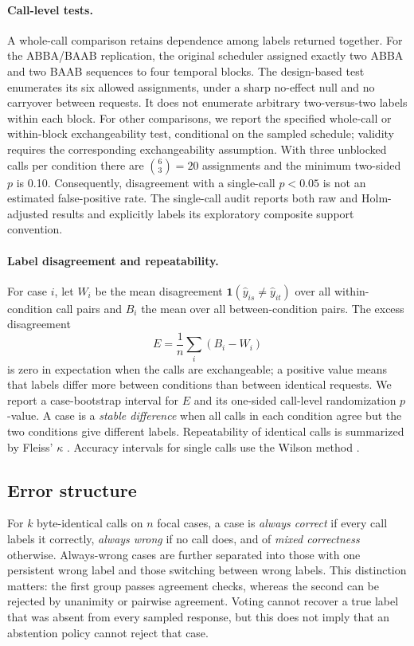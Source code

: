 \documentclass[11pt,a4paper]{article}
\begin{document}
\paragraph{Call-level tests.} A whole-call comparison retains dependence among labels returned together. For the ABBA/BAAB replication, the original scheduler assigned exactly two ABBA and two BAAB sequences to four temporal blocks. The design-based test enumerates its six allowed assignments, under a sharp no-effect null and no carryover between requests. It does not enumerate arbitrary two-versus-two labels within each block. For other comparisons, we report the specified whole-call or within-block exchangeability test, conditional on the sampled schedule; validity requires the corresponding exchangeability assumption. With three unblocked calls per condition there are $\binom{6}{3}=20$ assignments and the minimum two-sided $p$ is 0.10. Consequently, disagreement with a single-call $p<0.05$ is not an estimated false-positive rate. The single-call audit reports both raw and Holm-adjusted results and explicitly labels its exploratory composite support convention.

\paragraph{Label disagreement and repeatability.} For case $i$, let $W_i$ be the mean disagreement $\mathbf 1(\hat y_{is}\neq\hat y_{it})$ over all within-condition call pairs and $B_i$ the mean over all between-condition pairs. The excess disagreement
\begin{equation}
E=\frac1n\sum_i (B_i-W_i)
\end{equation}
is zero in expectation when the calls are exchangeable; a positive value means that labels differ more between conditions than between identical requests. We report a case-bootstrap interval for $E$ and its one-sided call-level randomization $p$-value. A case is a \emph{stable difference} when all calls in each condition agree but the two conditions give different labels. Repeatability of identical calls is summarized by Fleiss' $\kappa$ \citep{fleiss1971measuring}. Accuracy intervals for single calls use the Wilson method \citep{wilson1927probable}.

\subsection{Error structure}\label{sec:structure}
For $k$ byte-identical calls on $n$ focal cases, a case is \emph{always correct} if every call labels it correctly, \emph{always wrong} if no call does, and of \emph{mixed correctness} otherwise. Always-wrong cases are further separated into those with one persistent wrong label and those switching between wrong labels. This distinction matters: the first group passes agreement checks, whereas the second can be rejected by unanimity or pairwise agreement. Voting cannot recover a true label that was absent from every sampled response, but this does not imply that an abstention policy cannot reject that case.
\end{document}
